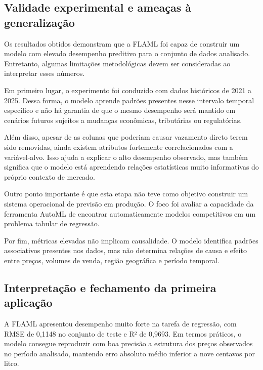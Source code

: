 \documentclass[11pt, a4paper, oneside]{article}
\begin{document}
\subsection{Validade experimental e ameaças à generalização}
\label{sec:flaml-validade}

Os resultados obtidos demonstram que a FLAML foi capaz de construir um modelo com
elevado desempenho preditivo para o conjunto de dados analisado. Entretanto, algumas
limitações metodológicas devem ser consideradas ao interpretar esses números.

Em primeiro lugar, o experimento foi conduzido com dados históricos de 2021 a 2025.
Dessa forma, o modelo aprende padrões presentes nesse intervalo temporal específico e
não há garantia de que o mesmo desempenho será mantido em cenários futuros sujeitos a
mudanças econômicas, tributárias ou regulatórias.

Além disso, apesar de as colunas que poderiam causar vazamento direto terem sido
removidas, ainda existem atributos fortemente correlacionados com a variável-alvo. Isso
ajuda a explicar o alto desempenho observado, mas também significa que o modelo está
aprendendo relações estatísticas muito informativas do próprio contexto de mercado.

Outro ponto importante é que esta etapa não teve como objetivo construir um sistema
operacional de previsão em produção. O foco foi avaliar a capacidade da ferramenta
AutoML de encontrar automaticamente modelos competitivos em um problema tabular de
regressão.

Por fim, métricas elevadas não implicam causalidade. O modelo identifica padrões
associativos presentes nos dados, mas não determina relações de causa e efeito entre
preços, volumes de venda, região geográfica e período temporal.
\subsection{Interpretação e fechamento da primeira aplicação}
\label{sec:flaml-interpretacao}

A FLAML apresentou desempenho muito forte na tarefa de regressão, com RMSE de 0,1148
no conjunto de teste e R² de 0,9693. Em termos práticos, o modelo consegue reproduzir
com boa precisão a estrutura dos preços observados no período analisado, mantendo erro
absoluto médio inferior a nove centavos por litro.
\end{document}
